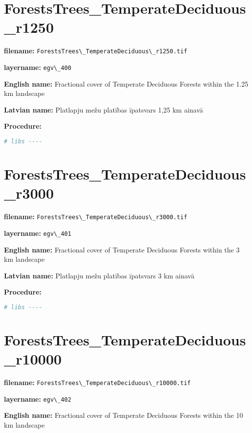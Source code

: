 \documentclass[
]{book}
\newcommand{\passthrough}[1]{#1}
\begin{document}
\section{ForestsTrees\_TemperateDeciduous\_r1250}\label{ch06.400}

\textbf{filename:} \passthrough{\lstinline!ForestsTrees\_TemperateDeciduous\_r1250.tif!}

\textbf{layername:} \passthrough{\lstinline!egv\_400!}

\textbf{English name:} Fractional cover of Temperate Deciduous Forests within the 1.25 km landscape

\textbf{Latvian name:} Platlapju mežu platības īpatsvars 1,25 km ainavā

\textbf{Procedure:}

\begin{lstlisting}[language=R]
# libs ----
\end{lstlisting}

\section{ForestsTrees\_TemperateDeciduous\_r3000}\label{ch06.401}

\textbf{filename:} \passthrough{\lstinline!ForestsTrees\_TemperateDeciduous\_r3000.tif!}

\textbf{layername:} \passthrough{\lstinline!egv\_401!}

\textbf{English name:} Fractional cover of Temperate Deciduous Forests within the 3 km landscape

\textbf{Latvian name:} Platlapju mežu platības īpatsvars 3 km ainavā

\textbf{Procedure:}

\begin{lstlisting}[language=R]
# libs ----
\end{lstlisting}

\section{ForestsTrees\_TemperateDeciduous\_r10000}\label{ch06.402}

\textbf{filename:} \passthrough{\lstinline!ForestsTrees\_TemperateDeciduous\_r10000.tif!}

\textbf{layername:} \passthrough{\lstinline!egv\_402!}

\textbf{English name:} Fractional cover of Temperate Deciduous Forests within the 10 km landscape
\end{document}
